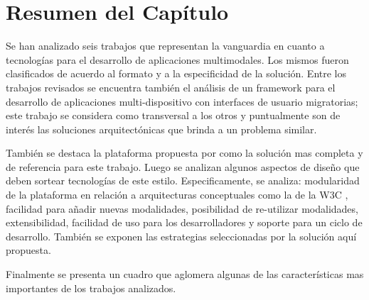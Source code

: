 \section{Resumen del Capítulo}\label{sec:estado_arte_summary}
Se han analizado seis trabajos que representan la vanguardia en cuanto a tecnologías para el desarrollo de aplicaciones multimodales. Los mismos fueron clasificados de acuerdo al formato y a la especificidad de la solución. Entre los trabajos revisados se encuentra también el análisis de un framework para el desarrollo de aplicaciones multi-dispositivo con interfaces de usuario migratorias; este trabajo se considera como transversal a los otros y puntualmente son de interés las soluciones arquitectónicas que brinda a un problema similar. 

También se destaca la plataforma propuesta por \citet*{lo2013chameleon} como la solución mas completa y de referencia para este trabajo. Luego se analizan algunos aspectos de diseño que deben sortear tecnologías de este estilo. Especificamente, se analiza: modularidad de la plataforma en relación a arquitecturas conceptuales como la de la W3C \citep{w3c:mmiarch}, facilidad para añadir nuevas modalidades, posibilidad de re-utilizar modalidades, extensibilidad, facilidad de uso para los desarrolladores y soporte para un ciclo de desarrollo. También se exponen las estrategias seleccionadas por la solución aquí propuesta. 

Finalmente se presenta un cuadro que aglomera algunas de las características mas importantes de los trabajos analizados.

